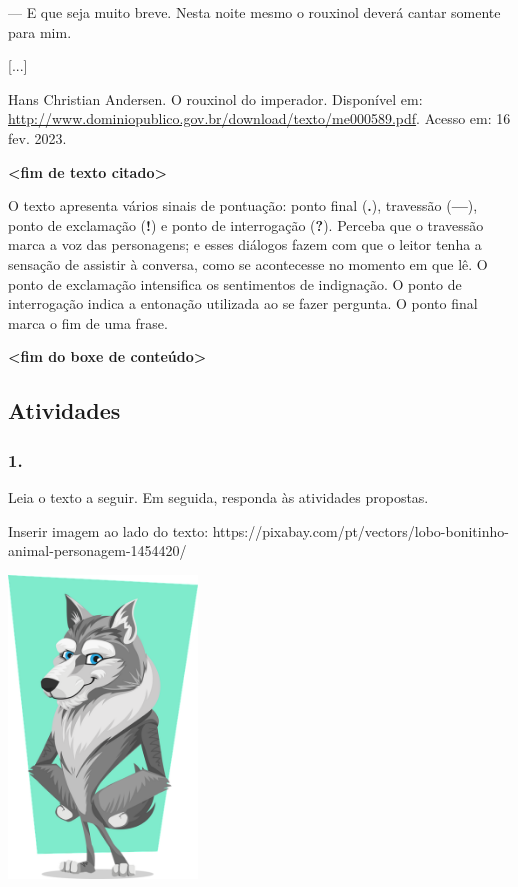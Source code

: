 --- E que seja muito breve. Nesta noite mesmo o rouxinol deverá cantar
somente para mim.

{[}...{]}

Hans Christian Andersen. O rouxinol do imperador. Disponível em:
\url{http://www.dominiopublico.gov.br/download/texto/me000589.pdf}.
Acesso em: 16 fev. 2023.

\textbf{\textless{}fim de texto citado\textgreater{}}

O texto apresenta vários sinais de pontuação: ponto final (\textbf{.}),
travessão (\textbf{---}), ponto de exclamação (\textbf{!}) e ponto de
interrogação (\textbf{?}). Perceba que o travessão marca a voz das
personagens; e esses diálogos fazem com que o leitor tenha a sensação de
assistir à conversa, como se acontecesse no momento em que lê. O ponto
de exclamação intensifica os sentimentos de indignação. O ponto de
interrogação indica a entonação utilizada ao se fazer pergunta. O ponto
final marca o fim de uma frase.

\textbf{\textless{}fim do boxe de conteúdo\textgreater{}}

\subsection{Atividades}\label{atividades-2}

\subsubsection{1. }\label{section-32}

Leia o texto a seguir. Em seguida, responda às atividades propostas.

Inserir imagem ao lado do texto:
https://pixabay.com/pt/vectors/lobo-bonitinho-animal-personagem-1454420/

\includegraphics[width=1.97917in,height=3.16667in]{media/image5.png}

